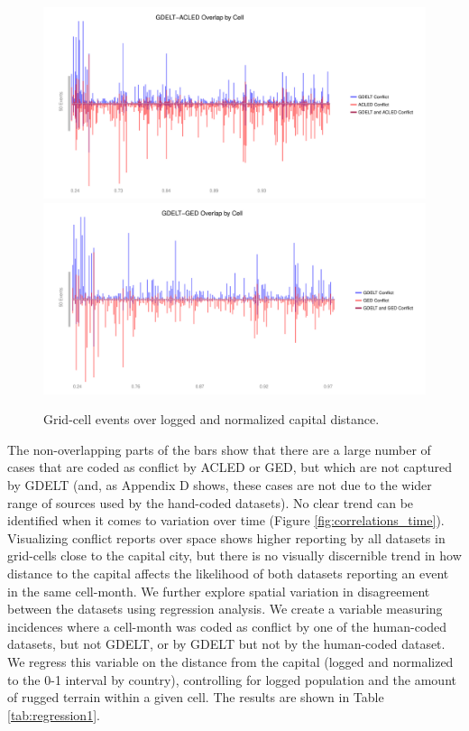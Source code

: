 \documentclass[hidelinks]{article}
\begin{document}
\begin{figure}[!htbp]
\includegraphics[width = 1 \textwidth]{spaceACLED.pdf}\\
\includegraphics[width = 1 \textwidth]{spaceGED.pdf}
\caption{Grid-cell events over logged and normalized capital distance.}\label{fig:correlations_space}
\end{figure}

The non-overlapping parts of the bars show that there are a large number of cases that are coded as conflict by ACLED or GED, but which are not captured by GDELT (and, as Appendix D shows, these cases are not due to the wider range of sources used by the hand-coded datasets). No clear trend can be identified when it comes to variation over time (Figure \ref{fig:correlations_time}). Visualizing conflict reports over space shows higher reporting by all datasets in grid-cells close to the capital city, but there is no visually discernible trend in how distance to the capital affects the likelihood of both datasets reporting an event in the same cell-month. We further explore spatial variation in disagreement between the datasets using regression analysis. We create a variable measuring incidences where a cell-month was coded as conflict by one of the human-coded datasets, but not GDELT, or by GDELT but not by the human-coded dataset. We regress this variable on the distance from the capital (logged and normalized to the 0-1 interval by country), controlling for logged population and the amount of rugged terrain within a given cell. The results are shown in Table \ref{tab:regression1}.
\end{document}
